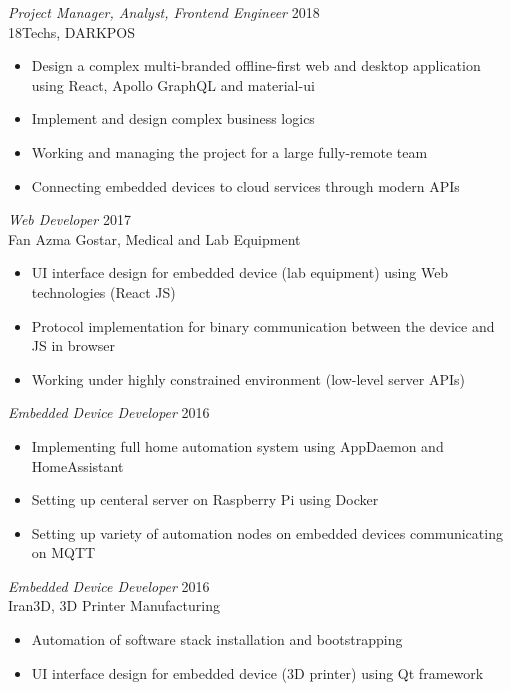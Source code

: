 \documentclass[margin, 10pt]{res} %
\begin{document}
\begin{resume}
{\sl Project Manager, Analyst, Frontend Engineer} \hfill 2018 \\
18Techs, DARKPOS  \\

\begin{itemize} \itemsep -2pt %
\item Design a complex multi-branded offline-first web and desktop application using
  React, Apollo GraphQL and material-ui
\item Implement and design complex business logics
\item Working and managing the project for a large fully-remote team
\item Connecting embedded devices to cloud services through modern APIs
\end{itemize}

{\sl Web Developer} \hfill 2017 \\
Fan Azma Gostar, Medical and Lab Equipment \\

\begin{itemize} \itemsep -2pt %
\item UI interface design for embedded device (lab equipment) using Web
  technologies (React JS)
\item Protocol implementation for binary communication between the device and JS
  in browser
\item Working under highly constrained environment (low-level server APIs)
\end{itemize}

{\sl Embedded Device Developer} \hfill 2016 \\
\begin{itemize} \itemsep -2pt %
\item Implementing full home automation system using AppDaemon and HomeAssistant
\item Setting up centeral server on Raspberry Pi using Docker
\item Setting up variety of automation nodes on embedded devices communicating on MQTT
\end{itemize}

{\sl Embedded Device Developer} \hfill 2016 \\
Iran3D, 3D Printer Manufacturing \\

\begin{itemize} \itemsep -2pt %
\item Automation of software stack installation and bootstrapping 
\item UI interface design for embedded device (3D printer) using Qt framework
\end{itemize}


\end{resume}
\end{document}
